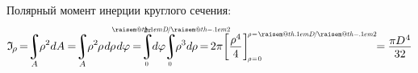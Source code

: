 \documentclass[14pt]{extarticle}
\makeatletter
\newcommand{\raisemath}[1]{\mathpalette{\raisem@th{#1}}}
\newcommand{\raisem@th}[3]{\raisebox{#1}{$#2#3$}}
\DeclareMathOperator*{\integral}{\scalerel*{\rotatebox{12}{$\!\textstyle\int\!$}}{\int}} %
\makeatother
\begin{document}
\newpage

Полярный момент инерции круглого сечения:
\[
\mathfrak{I}_{\hspace{-0.2ex}\scalebox{.8}{$\rho$}} \hspace{-0.25ex}
=\hspace{-0.6ex}
\integral_{A} \hspace{-0.6ex} \rho^2 dA \hspace{-0.1ex}
=\hspace{-0.6ex}
\integral_{A} \hspace{-0.6ex} \rho^2 \hspace{-.15ex} \rho \hspace{.2ex} d\hspace{-.1ex}\rho \hspace{.2ex} d\varphi \hspace{-0.1ex}
=\hspace{-0.6ex}
\integral_{\mathclap{\hspace{-.4ex} \scalebox{.6}{$ 0 $}}}^{\mathclap{\scalebox{.6}{$ 2\pi $}}} \hspace{-0.7ex} d\varphi \hspace{-.5ex}
\integral_{\mathclap{\hspace{-.4ex} \scalebox{.6}{$ 0 $}}}^{\mathclap{\scalebox{.6}{$ \raisemath{.1em}{D} \hspace{-.3ex} / \hspace{-.1ex} \raisemath{-.1em}{2} $}}} \hspace{-0.7ex} \rho^3 d\hspace{-.1ex}\rho \hspace{-0.2ex}
=\hspace{-0.25ex}
2\pi \hspace{-.4ex} \left[ \displaystyle\frac{\raisebox{-.15em}{$ \rho^4 $}}{4} \hspace{.1ex} \right]_{\hspace{-.25ex}\scalebox{.6}{$ \rho \!=\! 0 $}}^{\hspace{-.25ex} \scalebox{.6}{$ \rho \!=\! \raisemath{.1em}{D} \hspace{-.3ex} / \hspace{-.1ex} \raisemath{-.1em}{2} $}} \hspace{-.8ex}
=\hspace{-0.1ex}
\displaystyle\frac{\raisebox{-0.18em}{$\pi \hspace{-0.1ex} D^{\hspace{.1ex}4}$}}{32}
\]
\end{document}
